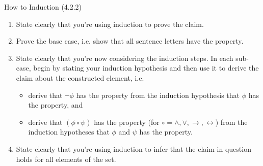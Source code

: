 \documentclass[../slides.tex]{subfiles}
\begin{document}
\begin{frame}{How to Induction (4.2.2)}

	\begin{enumerate}[1.]
		
			\item State clearly that you're using induction to prove the claim.
			
			\item Prove the base case, i.e. show that all sentence letters have the property.
			
			\item State clearly that you're now considering the induction steps. In each sub-case, begin by stating your induction hypothesis and then use it to derive the claim about the constructed element, i.e.
			\begin{itemize}
			
				\item derive that $\neg\phi$ has the property from the induction hypothesis that $\phi$ has the property, and
				
				\item derive that $(\phi\circ\psi)$ has the property (for $\circ=\land,\lor,\to,\leftrightarrow$) from the induction hypotheses that $\phi$ and $\psi$ has the property.
			
			\end{itemize}
			
			\item State clearly that you're using induction to infer that the claim in question holds for all elements of the set.
		
		\end{enumerate}

\end{frame}		
\end{document}

